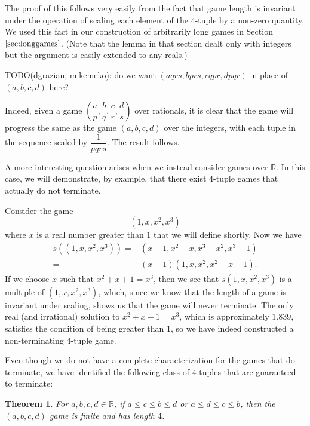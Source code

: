 \documentclass[12pt]{amsart}
\newtheorem{theorem}{Theorem}[section]
\newcommand{\diff}{s}
\begin{document}
The proof of this follows very easily from the fact that game length is invariant under the operation of scaling each element of the $4$-tuple by a non-zero quantity. We used this fact in our construction of arbitrarily long games in Section $\ref{sec:longgames}$. (Note that the lemma in that section dealt only with integers but the argument is easily extended to any reals.)

TODO(dgrazian, mikemeko): do we want $(aqrs, bprs, cqpr, dpqr)$ in place of $(a,b,c,d)$ here?

Indeed, given a game $\left(\dfrac{a}{p}, \dfrac{b}{q}, \dfrac{c}{r}, \dfrac{d}{s}\right)$ over rationals, it is clear that the game will progress the same as the game $(a, b, c, d)$ over the integers, with each tuple in the sequence scaled by $\dfrac{1}{pqrs}$. The result follows.

A more interesting question arises when we instead consider games over $\mathbb{R}$. In this case, we will demonstrate, by example, that there exist $4$-tuple games that actually do not terminate.

Consider the game
$$
(1,x,x^2,x^3)
$$
where $x$ is a real number greater than $1$ that we will define shortly. Now we have
\begin{align*}
\diff((1,x,x^2,x^3))
= & (x-1, x^2 - x, x^3 - x^2, x^3 - 1) \\
= & (x-1) (1, x, x^2, x^2 + x + 1).
\end{align*}
If we choose $x$ such that $x^2 + x + 1 = x^3$, then we see that $s(1,x,x^2,x^3)$ is a multiple of $(1,x,x^2,x^3)$, which, since we know that the length of a game is invariant under scaling, shows us that the game will never terminate. The only real (and irrational) solution to $x^2 + x + 1 = x^3$, which is approximately $1.839$, satisfies the condition of being greater than $1$, so we have indeed constructed a non-terminating $4$-tuple game.

Even though we do not have a complete characterization for the games that do terminate, we have identified the following class of $4$-tuples that are guaranteed to terminate:

\begin{theorem}
\label{thm:inequalities}
For $a,b,c,d\in \mathbb{R}$, if $a \leq c \leq b \leq d$ or $a \leq d \leq c \leq b$, then the $(a,b,c,d)$ game is finite and has length $4$. 
\end{theorem}
\end{document}
